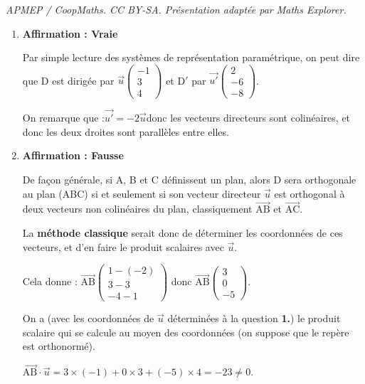 \documentclass[10pt]{article}
\providecommand{\vect}[1]{\overrightarrow{#1}}
\begin{document}
\noindent\textit{APMEP / CoopMaths. CC BY-SA. Présentation adaptée par Maths Explorer.}\par\medskip
\medskip

\begin{enumerate}
\item \textbf{Affirmation : Vraie}

Par simple lecture des systèmes de représentation paramétrique, on peut dire que D est dirigée par $\vect{u}\begin{pmatrix}-1\\3\\4\end{pmatrix}$ et D$'$ par $\vect{u'}\begin{pmatrix} 2\\-6\\-8	\end{pmatrix}$.

On remarque que :\quad $\vect{u'} = -2\vect{u}$\quad donc les vecteurs directeurs sont colinéaires, et donc les deux droites sont parallèles entre elles.

\item \textbf{Affirmation : Fausse}

De façon générale, si A, B et C définissent un plan, alors D sera orthogonale au plan (ABC) si et seulement si son vecteur directeur $\vect{u}$ est orthogonal à deux vecteurs non colinéaires du plan, classiquement $\vect{\mathrm{AB}}$ et $\vect{\mathrm{AC}}$.

La \textbf{méthode classique} serait donc de déterminer les coordonnées de ces vecteurs, et d'en faire le produit scalaires avec $\vect{u}$.

Cela donne : \quad $\vect{\mathrm{AB}} \begin{pmatrix}1 - (-2)\\3 - 3\\-4 - 1\end{pmatrix}$ donc $\vect{\mathrm{AB}} \begin{pmatrix}3\\0\\-5\end{pmatrix}$.

On a (avec les coordonnées de $\vect{u}$ déterminées à la question \textbf{1.}) le produit scalaire qui se calcule au moyen des coordonnées (on suppose que le repère est orthonormé).

$\vect{\mathrm{AB}}\cdot\vect{u} = 3\times (-1) + 0 \times 3 + (-5) \times 4 = -23 \neq 0$.


\end{enumerate}
\end{document}
